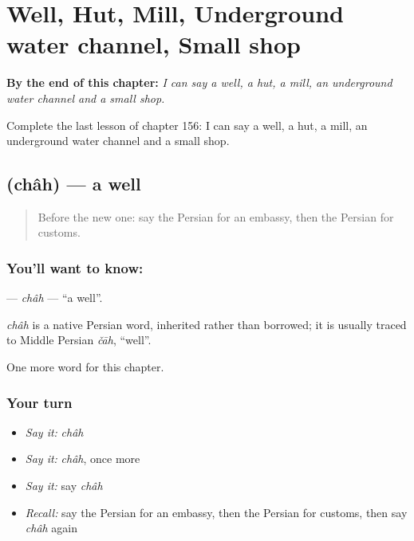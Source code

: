 
\chapter{Well, Hut, Mill, Underground water channel, Small shop}
\label{ch:fa-well-hut-mill-underground-water-channel-small-shop}

\begin{chapteropening}
\textbf{By the end of this chapter:} \emph{I can say a well, a hut, a mill, an underground water channel and a small shop.}

Complete the last lesson of chapter 156: I can say a well, a hut, a mill, an underground water channel and a small shop.
\end{chapteropening}

\section[\texorpdfstring{\fa{چاه} (châh)}{چاه (châh)}]{ (châh) — a well}

\label{lesson:FA-C156-chah}



\begin{quote}
Before the new one: say the Persian for an embassy, then the Persian for customs.
\end{quote}

\subsection*{You'll want to know: }
\textbf{} — \emph{châh} — \textquotedblleft{}a well\textquotedblright{}.

\begin{cousinweb}
\emph{châh} is a native Persian word, inherited rather than borrowed; it is usually traced to Middle Persian \emph{čāh}, \textquotedblleft{}well\textquotedblright{}.
\end{cousinweb}

\begin{grammarlens}[title={What you've built}]
One more word for this chapter.
\end{grammarlens}

\subsection*{Your turn}
\begin{itemize}
\raggedright
  \item \emph{Say it:} \emph{châh}
  \item \emph{Say it:} \emph{châh}, once more
  \item \emph{Say it:} say \emph{châh}
  \item \emph{Recall:} say the Persian for an embassy, then the Persian for customs, then say \emph{châh} again
\end{itemize}

